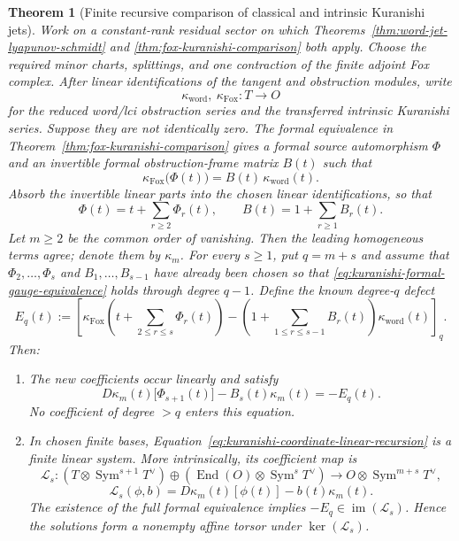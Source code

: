 \documentclass[11pt]{article}
\newtheorem{theorem}{Theorem}[section]
\theoremstyle{definition}
\begin{document}
\begin{theorem}[Finite recursive comparison of classical and intrinsic Kuranishi jets]\label{thm:kuranishi-jet-coordinate-recursion}
Work on a constant-rank residual sector on which
Theorems~\ref{thm:word-jet-lyapunov-schmidt} and
\ref{thm:fox-kuranishi-comparison} both apply.  Choose the required minor
charts, splittings, and one contraction of the finite adjoint Fox complex.
After linear identifications of the tangent and obstruction modules, write
\[
 \kappa_{\mathrm{word}},\ \kappa_{\mathrm{Fox}}:T\longrightarrow O
\]
for the reduced word/lci obstruction series and the transferred intrinsic
Kuranishi series.  Suppose they are not identically zero.  The formal
equivalence in Theorem~\ref{thm:fox-kuranishi-comparison} gives a formal source
automorphism $\Phi$ and an invertible formal obstruction-frame matrix $B(t)$
such that
\begin{equation}\label{eq:kuranishi-formal-gauge-equivalence}
 \kappa_{\mathrm{Fox}}\bigl(\Phi(t)\bigr)
 =B(t)\,\kappa_{\mathrm{word}}(t).
\end{equation}
Absorb the invertible linear parts into the chosen linear identifications, so
that
\[
 \Phi(t)=t+\sum_{r\ge2}\Phi_r(t),
 \qquad
 B(t)=1+\sum_{r\ge1}B_r(t).
\]
Let $m\ge2$ be the common order of vanishing.  Then the leading homogeneous
terms agree; denote them by $\kappa_m$.  For every $s\ge1$, put $q=m+s$ and
assume that $\Phi_2,\ldots,\Phi_s$ and
$B_1,\ldots,B_{s-1}$ have already been chosen so that
\eqref{eq:kuranishi-formal-gauge-equivalence} holds through degree $q-1$.
Define the known degree-$q$ defect
\begin{equation}\label{eq:kuranishi-coordinate-defect}
 E_q(t):=
 \left[
 \kappa_{\mathrm{Fox}}\!\left(
 t+\sum_{2\le r\le s}\Phi_r(t)
 \right)
 -\left(1+\sum_{1\le r\le s-1}B_r(t)\right)
 \kappa_{\mathrm{word}}(t)
 \right]_q.
\end{equation}
Then:
\begin{enumerate}[label=\textnormal{(\roman*)}]
\item The new coefficients occur linearly and satisfy
\begin{equation}\label{eq:kuranishi-coordinate-linear-recursion}
 D\kappa_m(t)\bigl[\Phi_{s+1}(t)\bigr]
 -B_s(t)\kappa_m(t)
 =-E_q(t).
\end{equation}
No coefficient of degree $>q$ enters this equation.

\item In chosen finite bases, Equation~\eqref{eq:kuranishi-coordinate-linear-recursion}
is a finite linear system.  More intrinsically, its coefficient map is
\begin{equation}\label{eq:kuranishi-coordinate-linear-operator}
 \mathcal L_s:
 \left(T\otimes\operatorname{Sym}^{s+1}T^\vee\right)
 \oplus
 \left(\operatorname{End}(O)\otimes\operatorname{Sym}^{s}T^\vee\right)
 \longrightarrow
 O\otimes\operatorname{Sym}^{m+s}T^\vee,
\end{equation}
\[
 \mathcal L_s(\phi,b)
 =D\kappa_m(t)[\phi(t)]-b(t)\kappa_m(t).
\]
The existence of the full formal equivalence implies
$-E_q\in\operatorname{im}(\mathcal L_s)$.  Hence the solutions form a nonempty
affine torsor under $\ker(\mathcal L_s)$.


\end{enumerate}
\end{theorem}
\end{document}
